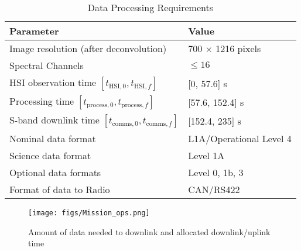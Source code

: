 \begin{table}[htbp]
	\caption{Data Processing Requirements}
	\label{tab:data_reqs}
	\centering
		\begin{tabular}{l l}
			\hline 															
			Parameter & Value \\
			\hline
			Image resolution (after deconvolution) & 700 $\times$ 1216 pixels \\
			Spectral Channels & $\leq16$ \\
			HSI observation time $[t_{\text{HSI}, 0}, t_{\text{HSI}, f}]$ & [0, 57.6] s \\
			Processing time $[t_{\text{process}, 0}, t_{\text{process}, f}]$ & [57.6, 152.4] s \\
			S-band downlink time $[t_{\text{comms}, 0}, t_{\text{comms}, f}]$ & [152.4, 235] s\\
			Nominal data format & L1A/Operational Level 4 \\
			Science data format & Level 1A \\
			Optional data formats & Level 0, 1b, 3 \\
			Format of data to Radio & CAN/RS422 \\
			\hline
		\end{tabular}
\end{table}
\begin{figure}[htbp]
	\centering
	\texttt{[image: figs/Mission\_ops.png]}
	\caption{Amount of data needed to downlink and allocated downlink/uplink time}
	\label{fig:mission_data}
\end{figure}

